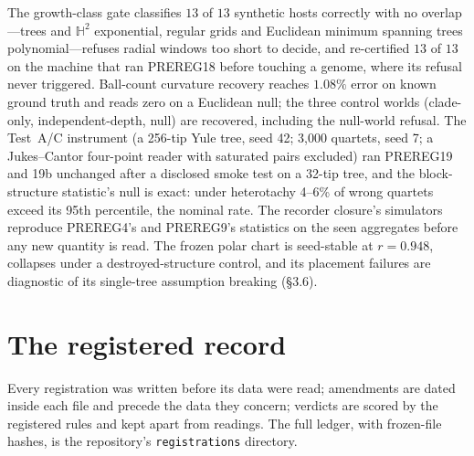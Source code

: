 \documentclass[11pt]{article}
\newcommand{\Htwo}{\mathbb{H}^2}
\begin{document}
The growth-class gate classifies $13$ of $13$ synthetic hosts correctly with no overlap---trees and $\Htwo$ exponential, regular grids and Euclidean minimum spanning trees polynomial---refuses radial windows too short to decide, and re-certified $13$ of $13$ on the machine that ran PREREG18 before touching a genome, where its refusal never triggered. Ball-count curvature recovery reaches $1.08\%$ error on known ground truth and reads zero on a Euclidean null; the three control worlds (clade-only, independent-depth, null) are recovered, including the null-world refusal. The Test~A/C instrument (a 256-tip Yule tree, seed 42; 3,000 quartets, seed 7; a Jukes--Cantor four-point reader with saturated pairs excluded) ran PREREG19 and 19b unchanged after a disclosed smoke test on a 32-tip tree, and the block-structure statistic's null is exact: under heterotachy 4--6\% of wrong quartets exceed its 95th percentile, the nominal rate. The recorder closure's simulators reproduce PREREG4's and PREREG9's statistics on the seen aggregates before any new quantity is read. The frozen polar chart is seed-stable at $r=0.948$, collapses under a destroyed-structure control, and its placement failures are diagnostic of its single-tree assumption breaking (\S3.6).

\section{The registered record}

Every registration was written before its data were read; amendments are dated inside each file and precede the data they concern; verdicts are scored by the registered rules and kept apart from readings. The full ledger, with frozen-file hashes, is the repository's \texttt{registrations} directory.
\end{document}
